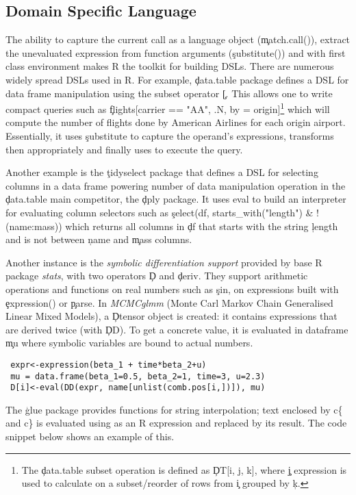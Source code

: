 \documentclass[screen,acmsmall]{acmart}
\begin{document}
\subsection{Domain Specific Language}

The ability to capture the current call as a language object (\c{match.call()}),
extract the unevaluated expression from function arguments (\c{substitute()})
and \eval with first class environment makes R the toolkit for building DSLs.
There are numerous widely spread DSLs used in R. For example, \c{data.table}
package defines a DSL for data frame manipulation using the subset operator
\c{[}. This allows one to write compact queries such as \c{flights[carrier ==
  "AA", .N, by = origin]}\footnote{The \c{data.table} subset operation is
  defined as \c{DT[i, j, k]}, where \c{j} expression is used to calculate on a
  subset/reorder of rows from \c{i} grouped by \c{k}.} which will compute the
number of flights done by American Airlines for each origin airport.
Essentially, it uses \c{substitute} to capture the operand's expressions,
transforms then appropriately and finally uses \eval to execute the query.

Another example is the \c{tidyselect} package that defines a DSL for selecting
columns in a data frame powering number of data manipulation operation in the
\c{data.table} main competitor, the \c{dply} package. It uses eval to build an
interpreter for evaluating column selectors such as \c{select(df,
starts\_with("length") \& !(name:mass))} which returns all columns in \c{df}
that starts with the string \c{length} and is not between \c{name} and
\c{mass} columns.


Another instance is the \emph{symbolic differentiation support} provided by base R package \emph{stats}, with two operators \c{D} and \c{deriv}. They support arithmetic operations and functions on real numbers such as \c{sin}, on expressions built with \c{expression()} or \c{parse}.
In \emph{MCMCglmm} (Monte Carl Markov Chain Generalised Linear Mixed Models), a \c{Dtensor} object is created: it contains expressions that are derived twice (with \c{DD}). To get a concrete value, it is evaluated in  dataframe \c{mu} where symbolic variables are bound to actual numbers.
\begin{lstlisting}
 expr<-expression(beta_1 + time*beta_2+u)
 mu = data.frame(beta_1=0.5, beta_2=1, time=3, u=2.3)
 D[i]<-eval(DD(expr, name[unlist(comb.pos[i,])]), mu)
\end{lstlisting}

The \c{glue} package provides functions for string interpolation; text enclosed
by c{\{} and c{\}} is evaluated using \eval as an R expression and replaced by
its result. The code snippet below shows an example of this.
\end{document}

